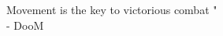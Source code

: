 \cleardoublepage
\thispagestyle{empty} %

\vspace*{8cm}

\hfill

{\doomfontL\huge{\Huge {} Movement is the key to victorious combat "} \\ \doomfontL \hspace{10cm} - {\huge D}{\doomfontR\huge o}{\doomfontL\huge o}}{\doomfontR\huge M}
